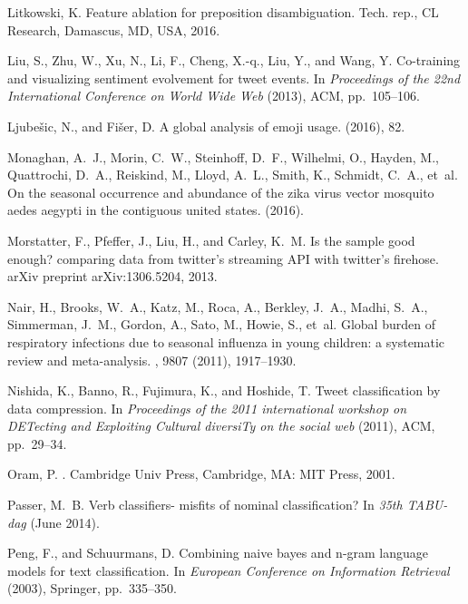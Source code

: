 \documentclass[10pt,letterpaper]{article}
\begin{document}
\begin{thebibliography}{10}
{\sc Litkowski, K.}
\newblock Feature ablation for preposition disambiguation.
\newblock Tech. rep., CL Research, Damascus, MD, USA, 2016.

{\sc Liu, S., Zhu, W., Xu, N., Li, F., Cheng, X.-q., Liu, Y., and Wang, Y.}
\newblock Co-training and visualizing sentiment evolvement for tweet events.
\newblock In {\em Proceedings of the 22nd International Conference on World
  Wide Web\/} (2013), ACM, pp.~105--106.

{\sc Ljube{\v{s}}ic, N., and Fi{\v{s}}er, D.}
\newblock A global analysis of emoji usage.
 (2016), 82.

{\sc Monaghan, A.~J., Morin, C.~W., Steinhoff, D.~F., Wilhelmi, O., Hayden, M.,
  Quattrochi, D.~A., Reiskind, M., Lloyd, A.~L., Smith, K., Schmidt, C.~A.,
  et~al.}
\newblock On the seasonal occurrence and abundance of the zika virus vector
  mosquito aedes aegypti in the contiguous united states.
 (2016).

{\sc Morstatter, F., Pfeffer, J., Liu, H., and Carley, K.~M.}
\newblock Is the sample good enough? comparing data from twitter's streaming
  {API} with twitter's firehose.
\newblock arXiv preprint arXiv:1306.5204, 2013.

{\sc Nair, H., Brooks, W.~A., Katz, M., Roca, A., Berkley, J.~A., Madhi, S.~A.,
  Simmerman, J.~M., Gordon, A., Sato, M., Howie, S., et~al.}
\newblock Global burden of respiratory infections due to seasonal influenza in
  young children: a systematic review and meta-analysis.
, 9807 (2011), 1917--1930.

{\sc Nishida, K., Banno, R., Fujimura, K., and Hoshide, T.}
\newblock Tweet classification by data compression.
\newblock In {\em Proceedings of the 2011 international workshop on DETecting
  and Exploiting Cultural diversiTy on the social web\/} (2011), ACM,
  pp.~29--34.

{\sc Oram, P.}
.
\newblock Cambridge Univ Press, Cambridge, MA: MIT Press, 2001.

{\sc Passer, M.~B.}
\newblock Verb classifiers- misfits of nominal classification?
\newblock In {\em 35th TABU-dag\/} (June 2014).

{\sc Peng, F., and Schuurmans, D.}
\newblock Combining naive bayes and n-gram language models for text
  classification.
\newblock In {\em European Conference on Information Retrieval\/} (2003),
  Springer, pp.~335--350.


\end{thebibliography}
\end{document}
